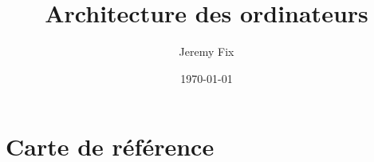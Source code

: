 \documentclass[a4paper]{book}
\title{Architecture des ordinateurs}
\author{Jeremy Fix}
\date{\today}
\begin{document}



\frontmatter
\maketitle


\pagebreak



\pagebreak
\tableofcontents







\mainmatter

























%



\appendix
\chapter{Carte de référence}



\backmatter

\end{document}
